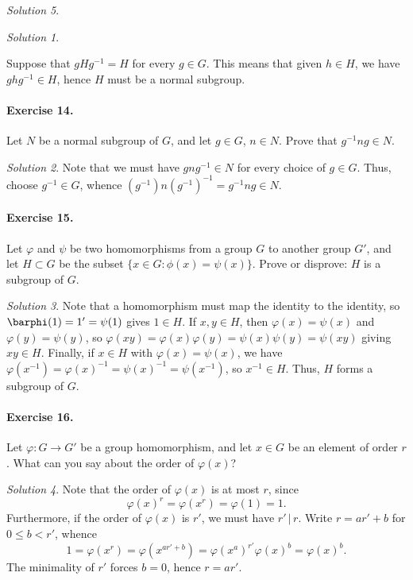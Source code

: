 \documentclass[11pt]{report}
\theoremstyle{remark}
\newtheorem*{solution}{Solution}
\begin{document}
\begin{solution}
\begin{solution}
\begin{enumerate}
        Suppose that $gHg^{-1} = H$ for every $g \in G$. This means that given $h
        \in H$, we have $ghg^{-1} \in H$, hence $H$ must be a normal subgroup.
    \end{enumerate}
    \end{solution}
    
    \paragraph{Exercise 14.} Let $N$ be a normal subgroup of $G$, and let $g \in G$,
    $n \in N$. Prove that $g^{-1}ng \in N$.
    \begin{solution}
        Note that we must have $gng^{-1} \in N$ for every choice of $g \in G$. Thus,
        choose $g^{-1} \in G$, whence $(g^{-1})n(g^{-1})^{-1} = g^{-1}ng \in N$.
    \end{solution}

    \paragraph{Exercise 15.} Let $\varphi$ and $\psi$ be two homomorphisms from a
    group $G$ to another group $G'$, and let $H \subset G$ be the subset $\{x \in
    G\colon \phi(x) = \psi(x)\}$. Prove or disprove: $H$ is a subgroup of $G$.
    \begin{solution}
        Note that a homomorphism must map the identity to the identity, so
        $\barphi(1) = 1' = \psi(1)$ gives $1 \in H$. If $x, y \in H$, then
        $\varphi(x) = \psi(x)$ and $\varphi(y) = \psi(y)$, so $\varphi(xy) =
        \varphi(x)\varphi(y) = \psi(x)\psi(y) = \psi(xy)$ giving $xy \in H$.
        Finally, if $x \in H$ with $\varphi(x) = \psi(x)$, we have $\varphi(x^{-1}) =
        \varphi(x)^{-1} = \psi(x)^{-1} = \psi(x^{-1})$, so $x^{-1} \in H$. Thus, $H$
        forms a subgroup of $G$.
    \end{solution}
    
    \paragraph{Exercise 16.} Let $\varphi\colon G \to G'$ be a group homomorphism,
    and let $x \in G$ be an element of order $r$. What can you say about the order
    of $\varphi(x)$?
    \begin{solution}
        Note that the order of $\varphi(x)$ is at most $r$, since \[
            \varphi(x)^r = \varphi(x^r) = \varphi(1) = 1.
        \] Furthermore, if the order of $\varphi(x)$ is $r'$, we must have $r' \,|\,
        r$. Write $r = ar' + b$ for $0 \leq b < r'$, whence \[
            1 = \varphi(x^r) = \varphi(x^{ar' + b}) = \varphi(x^a)^{r'}\varphi(x)^b
            = \varphi(x)^b.
        \] The minimality of $r'$ forces $b = 0$, hence $r = ar'$.
    \end{solution}


\end{solution}
\end{document}
